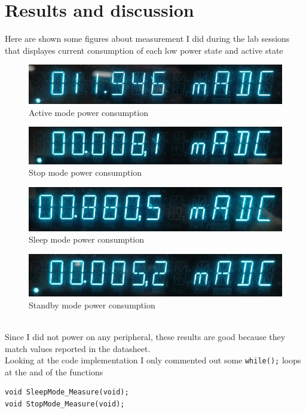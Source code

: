 \documentclass[peerreview]{IEEEtran}
\begin{document}
\section{Results and discussion}
Here are shown some figures about measurement I did during the lab sessions that displayes current consumption of each low power state and active state
\begin{figure}[!ht]
\centering
\includegraphics[width=0.7\columnwidth]{adc_active} 
\caption{Active mode power consumption}
\label{fig_A}
\end{figure}
\begin{figure}[!ht]
\centering
\includegraphics[width=0.7\columnwidth]{adc_stop} 
\caption{Stop mode power consumption}
\label{fig_B}
\end{figure}
\begin{figure}[!ht]
\centering
\includegraphics[width=0.7\columnwidth]{adc_sleep} 
\caption{Sleep mode power consumption}
\label{fig_C}
\end{figure}
\begin{figure}[!ht]
\centering
\includegraphics[width=0.7\columnwidth]{adc_standby} 
\caption{Standby mode power consumption}
\label{fig_D}
\end{figure}
\\Since I did not power on any peripheral, these results are good because they match values reported in the datasheet.\\
Looking at the code implementation I only commented out some \lstinline[style=CStyle]{while();} loops at the and of the functions 
\begin{lstlisting}[style=CStyle]
void SleepMode_Measure(void);
void StopMode_Measure(void);
\end{lstlisting}
\end{document}
